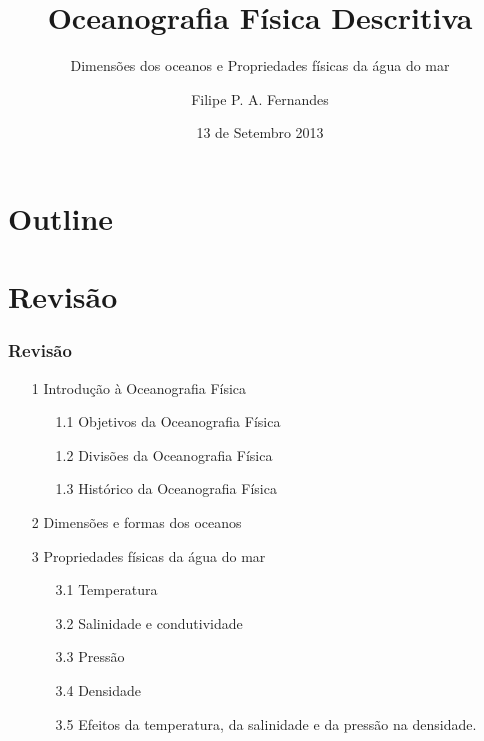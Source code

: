 \title[Aula 03]{Oceanografia Física Descritiva}
\subtitle{Dimensões dos oceanos e Propriedades físicas da água do mar}
\author[Filipe Fernandes]{Filipe P. A. Fernandes}
\date[Setembro 2013]{13 de Setembro 2013}




\begin{frame}[plain]
  \titlepage
\end{frame}

\section*{Outline}
\begin{frame}
\tableofcontents
\end{frame}

\section{Revisão}
\begin{frame}
\frametitle{Revisão}
    \footnotesize{
    \begin{itemize}[<+-| alert@+>]
    \item[1] Introdução à Oceanografia Física
    \begin{enumerate}[<+-| alert@+>]
        \item[1.1] Objetivos da Oceanografia Física
        \item[1.2] Divisões da Oceanografia Física
        \item[1.3] Histórico da Oceanografia Física
    \end{enumerate}
    \item[2] Dimensões e formas dos oceanos
    \item[3] Propriedades físicas da água do mar
    \begin{enumerate}[<+-| alert@+>]
        \item[3.1] Temperatura
        \item[3.2] Salinidade e condutividade
        \item[3.3] Pressão
        \item[3.4] Densidade
        \item[3.5] Efeitos da temperatura, da salinidade e da pressão na
                   densidade.
    \end{enumerate}
    \end{itemize}
    }
\end{frame}

